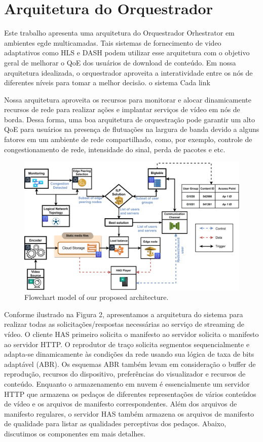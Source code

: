 \section{Arquitetura do Orquestrador}
\label{sec:mechanism}

Este trabalho apresenta uma arquitetura do Orquestrador Orhestrator em ambientes egde multicamadas. Tais sistemas de fornecimento de video adaptativos como HLS e DASH podem utilizar esse arquitetura com o objetivo geral de melhorar o QoE dos usuários de download de conteúdo. Em nossa arquitetura idealizada, o orquestrador aproveita a interatividade entre os nós de diferentes níveis para tomar a melhor decisão. o sistema Cada link

Nossa arquitetura aproveita os recursos para monitorar e alocar dinamicamente recursos de rede para realizar ações e implantar serviços de vídeo em nós de borda. Dessa forma, uma boa arquitetura de orquestração pode garantir um alto QoE para usuários na presença de flutuações na largura de banda devido a alguns fatores em um ambiente de rede compartilhado, como, por exemplo, controle de congestionamento de rede, intensidade do sinal, perda de pacotes e etc.

\begin{figure}
  \includegraphics[width=\linewidth]{images/flow-model-infrastructure.pdf}
  \caption{Flowchart model of our proposed architecture.}
\end{figure}

Conforme ilustrado na Figura 2, apresentamos a arquitetura do sistema para realizar todas as solicitações/respostas necessárias ao serviço de streaming de vídeo. O cliente HAS primeiro solicita o manifesto ao servidor solicita o manifesto ao servidor HTTP. O reprodutor de traço solicita segmentos sequencialmente e adapta-se dinamicamente às condições da rede usando sua lógica de taxa de bits adaptável (ABR). Os esquemas ABR também levam em consideração o buffer de reprodução, recursos do dispositivo, preferências do visualizador e recursos de conteúdo. Enquanto o armazenamento em nuvem é essencialmente um servidor HTTP que armazena os pedaços de diferentes representações de vários conteúdos de vídeo e os arquivos de manifesto correspondentes. Além dos arquivos de manifesto regulares, o servidor HAS também armazena os arquivos de manifesto de qualidade para listar as qualidades perceptivas dos pedaços. Abaixo, discutimos os componentes em mais detalhes.


